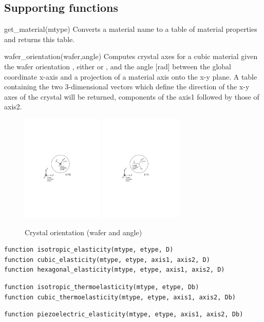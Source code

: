 \clearpage
\subsection{Supporting functions}
\begin{codelist}
  \item[get\_material(mtype)] 
    Converts a material name  to a table of material
    properties and returns this table.
  \item[wafer\_orientation(wafer,angle)]
    Computes crystal axes for a cubic material given the wafer orientation
    , either  or , and the angle [rad]
    between 
    the global coordinate x-axis and a projection of a material axis 
    onto the x-y plane. A
    table  containing the two 3-dimensional vectors which 
    define the direction of the x-y axes of the crystal will be returned,
    components of the axis1 followed by those of axis2. 
    \begin{figure}[htbp]
    \centering
    \includegraphics[trim=1.2in 4.0in 3.2in 3.0in, clip, height=2in]{fig/crystalaxis100.pdf}
    \includegraphics[trim=1.2in 4.0in 3.2in 3.0in, clip, height=2in]{fig/crystalaxis111.pdf}
    \caption{Crystal orientation (wafer and angle)}
    \label{fig:CrystalOrientation}
    \end{figure}
\end{codelist}

\begin{verbatim}
function isotropic_elasticity(mtype, etype, D)
function cubic_elasticity(mtype, etype, axis1, axis2, D)
function hexagonal_elasticity(mtype, etype, axis1, axis2, D)
\end{verbatim}
\begin{verbatim}
function isotropic_thermoelasticity(mtype, etype, Db)
function cubic_thermoelasticity(mtype, etype, axis1, axis2, Db)
\end{verbatim}
\begin{verbatim}
function piezoelectric_elasticity(mtype, etype, axis1, axis2, Db)
\end{verbatim}
